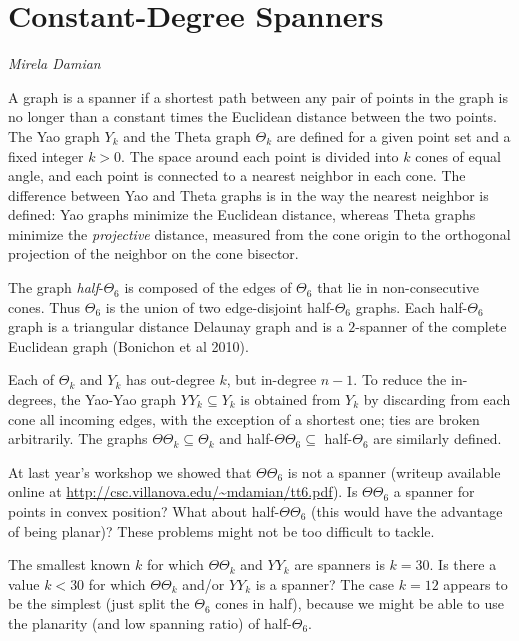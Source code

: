 \documentclass{patmorin}
\begin{document}
\section{Constant-Degree Spanners}

\noindent\emph{Mirela Damian}

A graph is a spanner if a shortest path between any pair of points in the
graph is no longer than a constant times the Euclidean distance between
the two points.  The Yao graph $Y_k$ and the Theta graph $\Theta_k$
are defined for a given point set and a fixed integer $k > 0$. The space
around each point is divided into $k$ cones of equal angle, and each point
is connected to a nearest neighbor in each cone. The difference between
Yao and Theta graphs is in the way the nearest neighbor is defined: Yao
graphs minimize the Euclidean distance, whereas Theta graphs minimize
the \emph{projective} distance, measured from the cone origin to the
orthogonal projection of the neighbor on the cone bisector.

The graph \emph{half}-$\Theta_6$ is composed of the edges of $\Theta_6$
that lie in non-consecutive cones. Thus $\Theta_6$ is the union of two
edge-disjoint half-$\Theta_6$ graphs.  Each half-$\Theta_6$ graph is a
triangular distance Delaunay graph and is a $2$-spanner of the complete
Euclidean graph (Bonichon et al 2010).

Each of $\Theta_k$ and $Y_k$ has out-degree $k$, but in-degree $n-1$. To
reduce the in-degrees, the Yao-Yao graph $YY_k \subseteq Y_k$ is obtained
from $Y_k$ by discarding from each cone all incoming edges, with the
exception of a shortest one; ties are broken arbitrarily. The graphs
$\Theta\Theta_k \subseteq \Theta_k$ and half-$\Theta\Theta_6 \subseteq$
half-$\Theta_6$ are similarly defined.

\begin{op}
At last year's workshop we showed that $\Theta\Theta_6$ is not a spanner (writeup available online at \url{http://csc.villanova.edu/~mdamian/tt6.pdf}). Is $\Theta\Theta_6$ a spanner for points in convex position? What about half-$\Theta\Theta_6$ (this would have the advantage of being planar)? These problems might not be too difficult to tackle. 
\end{op}

\begin{op}
The smallest known $k$ for which $\Theta\Theta_k$ and $YY_k$ are spanners is $k = 30$. Is there a value $k < 30$ for which $\Theta\Theta_k$ and/or $YY_k$ is a spanner? The case $k = 12$ appears to be the simplest (just split the $\Theta_6$ cones in half), because we might be able to use the planarity (and low spanning ratio) of half-$\Theta_6$.
\end{op}
\end{document}
